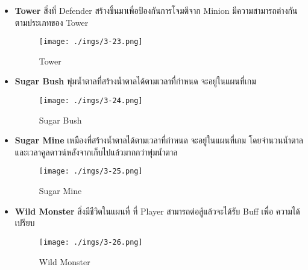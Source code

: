 \documentclass[12pt,oneside,openright,a4paper]{cpe-thai-project}
\begin{document}
\begin{itemize}
  \pagebreak  
  \item \textbf{Tower} สิ่งที่ Defender สร้างขึ้นมาเพื่อป้องกันการโจมตีจาก Minion 				
  มีความสามารถต่างกันตามประเภทของ Tower
    
    \begin{figure}[H]\centering
      \texttt{[image: ./imgs/3-23.png]}
      \caption{Tower}\label{fig:3-23}
    \end{figure}

  \item \textbf{Sugar Bush} พุ่มน้ำตาลที่สร้างน้ำตาลได้ตามเวลาที่กำหนด จะอยู่ในแผนที่เกม
      
    \begin{figure}[H]\centering
      \texttt{[image: ./imgs/3-24.png]}
      \caption{Sugar Bush}\label{fig:3-24}
    \end{figure}

  \item \textbf{Sugar Mine} เหมืองที่สร้างน้ำตาลได้ตามเวลาที่กำหนด จะอยู่ในแผนที่เกม 
  โดยจำนวนน้ำตาลและเวลาคูลดาวน์หลังจากเก็บไปแล้วมากกว่าพุ่มน้ำตาล
      
    \begin{figure}[H]\centering
      \texttt{[image: ./imgs/3-25.png]}
      \caption{Sugar Mine}\label{fig:3-25}
    \end{figure}
  
  \item \textbf{Wild Monster} สิ่งมีชีวิตในแผนที่ ที่ Player สามารถต่อสู้แล้วจะได้รับ Buff เพื่อ
  ความได้เปรียบ

    \begin{figure}[H]\centering
      \texttt{[image: ./imgs/3-26.png]}
      \caption{Wild Monster}\label{fig:3-26}
    \end{figure}
\end{itemize}
  
\end{document}
